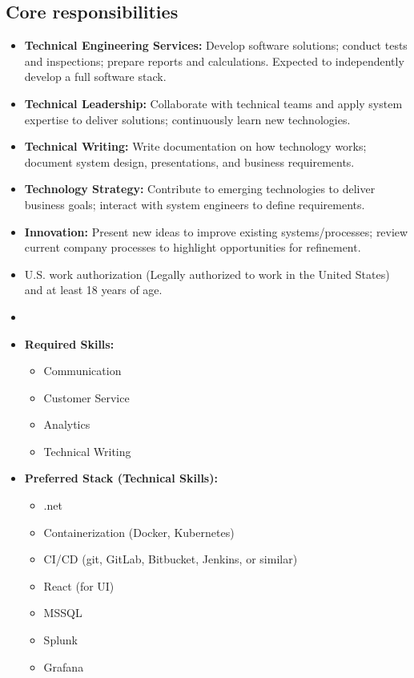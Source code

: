 \documentclass[11pt]{article}
\begin{document}
\subsection*{Core responsibilities}
\begin{itemize}
  \item \textbf{Technical Engineering Services:} Develop software solutions; 
    conduct tests and inspections; prepare reports and calculations. 
    Expected to independently develop a full software stack.
  \item \textbf{Technical Leadership:} Collaborate with technical teams and 
    apply system expertise to deliver solutions; continuously learn new 
    technologies.
  \item \textbf{Technical Writing:} Write documentation on how technology 
    works; document system design, presentations, and business requirements.
  \item \textbf{Technology Strategy:} Contribute to emerging technologies to 
    deliver business goals; interact with system engineers to define 
    requirements.
  \item \textbf{Innovation:} Present new ideas to improve existing 
    systems/processes; review current company processes to highlight 
    opportunities for refinement.
  \item U.S. work authorization (Legally authorized to work in the United 
    States) and at least 18 years of age.
  
  \item \hrulefill
  
  \item \textbf{Required Skills:}
  \begin{itemize}
    \item Communication
    \item Customer Service
    \item Analytics
    \item Technical Writing
  \end{itemize}
  
  \item \textbf{Preferred Stack (Technical Skills):}
  \begin{itemize}
    \item .net
    \item Containerization (Docker, Kubernetes)
    \item CI/CD (git, GitLab, Bitbucket, Jenkins, or similar)
    \item React (for UI)
    \item MSSQL
    \item Splunk
    \item Grafana
  \end{itemize}
  

\end{itemize}
\end{document}
